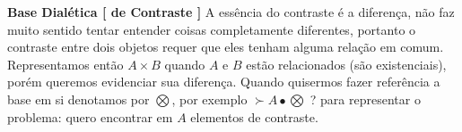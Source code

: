 \documentclass[10pt,a4paper]{report}
\begin{document}




\hspace{\baselineskip}

\textbf{Base Dialética [ de Contraste ]} A essência do contraste é a diferença, não faz muito sentido tentar entender coisas completamente diferentes, portanto o contraste entre dois objetos requer que eles tenham alguma relação em comum. Representamos então $A \times B$ quando $A$ e $B$ estão relacionados (são existenciais), porém queremos evidenciar sua diferença. Quando quisermos fazer referência a base em si denotamos por $\bigotimes$, por exemplo $\succ A \bullet \bigotimes$ ? para representar o problema: quero encontrar em $A$ elementos de contraste.\\
\end{document}
